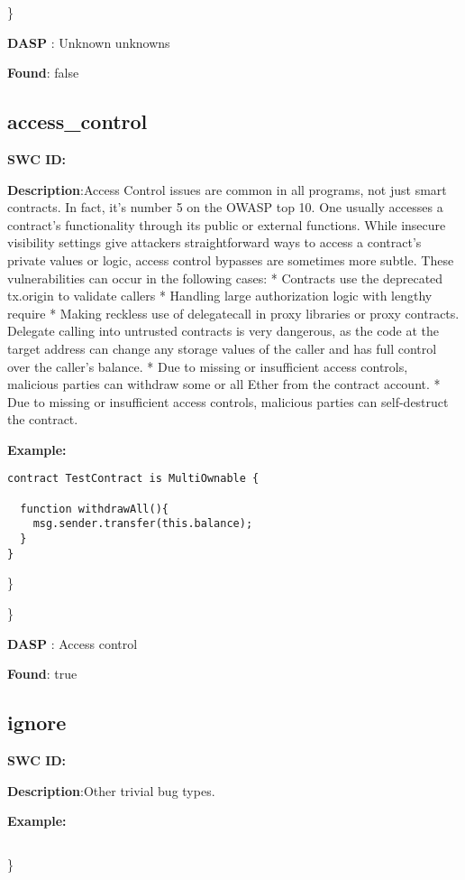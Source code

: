 \documentclass{article}
\begin{document}
\} 

\textbf{DASP} : Unknown unknowns

\textbf{Found}: false

\subsection{access\_control} 
\textbf{SWC \textunderscore ID:} 

\textbf{Description}:Access Control issues are common in all programs, not just smart contracts. In fact, it's number 5 on the OWASP top 10. One usually accesses a contract's functionality through its public or external functions. While insecure visibility settings give attackers straightforward ways to access a contract's private values or logic, access control bypasses are sometimes more subtle. These vulnerabilities can occur in the following cases:
* Contracts use the deprecated tx.origin to validate callers
* Handling large authorization logic with lengthy require
* Making reckless use of delegatecall in proxy libraries or proxy contracts. Delegate calling into untrusted contracts is very dangerous, as the code at the target address can change any storage values of the caller and has full control over the caller's balance.
* Due to missing or insufficient access controls, malicious parties can withdraw some or all Ether from the contract account.
* Due to missing or insufficient access controls, malicious parties can self-destruct the contract.


\textbf{Example:} 
\begin{verbatim}
contract TestContract is MultiOwnable {

  function withdrawAll(){
    msg.sender.transfer(this.balance);
  }
}

\end{verbatim}\} 

\} 

\textbf{DASP} : Access control

\textbf{Found}: true

\subsection{ignore} 
\textbf{SWC \textunderscore ID:} 

\textbf{Description}:Other trivial bug types.


\textbf{Example:} 
\begin{verbatim}

\end{verbatim}\} 
\end{document}
